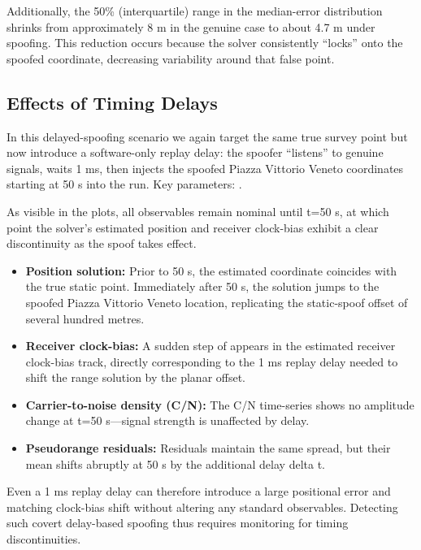         \vspace{0.2cm}
        
        \noindent Additionally, the 50\% (interquartile) range in the median-error distribution shrinks from approximately 8 m in the genuine case to about 4.7 m under spoofing. 
        This reduction occurs because the solver consistently “locks” onto the spoofed coordinate, decreasing variability around that false point.

    \subsection{Effects of Timing Delays}

        In this delayed-spoofing scenario we again target the same true survey point but now introduce a software-only replay delay: the spoofer “listens” to genuine signals, waits 1 ms, then injects the spoofed Piazza Vittorio Veneto coordinates starting at 50 s into the run. 
        Key parameters: .


        \noindent As visible in the plots, all observables remain nominal until t=50 s, at which point the solver's estimated position and receiver clock-bias exhibit a clear discontinuity as the spoof takes effect.

        \begin{itemize}
            \item \textbf{Position solution:} Prior to 50 s, the estimated coordinate coincides with the true static point. Immediately after 50 s, the solution jumps to the spoofed Piazza Vittorio Veneto location, replicating the static-spoof offset of several hundred metres.  
            \item \textbf{Receiver clock-bias:} A sudden step of appears in the estimated receiver clock-bias track, directly corresponding to the 1 ms replay delay needed to shift the range solution by the planar offset.  
            \item \textbf{Carrier-to-noise density (C/N):} The C/N time-series shows no amplitude change at t=50 s—signal strength is unaffected by delay.  
            \item \textbf{Pseudorange residuals:} Residuals maintain the same spread, but their mean shifts abruptly at 50 s by the additional delay delta t.  
        \end{itemize}
        
        \noindent Even a 1 ms replay delay can therefore introduce a large positional error and matching clock-bias shift without altering any standard observables. Detecting such covert delay-based spoofing thus requires monitoring for timing discontinuities.


